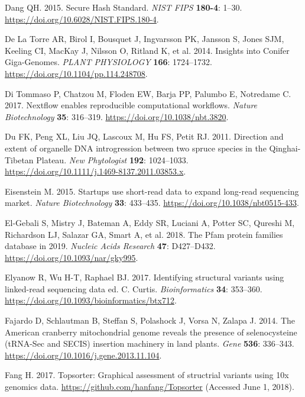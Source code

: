 \documentclass[
  12pt,
  oneside,
  openany]{book}
\begin{document}
\leavevmode\hypertarget{ref-Dang_2015}{}%
Dang QH. 2015. Secure Hash Standard. \emph{NIST FIPS} \textbf{180-4}: 1--30. \url{https://doi.org/10.6028/NIST.FIPS.180-4}.

\leavevmode\hypertarget{ref-De_La_Torre_2014}{}%
De La Torre AR, Birol I, Bousquet J, Ingvarsson PK, Jansson S, Jones SJM, Keeling CI, MacKay J, Nilsson O, Ritland K, et al. 2014. Insights into Conifer Giga-Genomes. \emph{PLANT PHYSIOLOGY} \textbf{166}: 1724--1732. \url{https://doi.org/10.1104/pp.114.248708}.

\leavevmode\hypertarget{ref-Di_Tommaso_2017}{}%
Di Tommaso P, Chatzou M, Floden EW, Barja PP, Palumbo E, Notredame C. 2017. Nextflow enables reproducible computational workflows. \emph{Nature Biotechnology} \textbf{35}: 316--319. \url{https://doi.org/10.1038/nbt.3820}.

\leavevmode\hypertarget{ref-Du_2011}{}%
Du FK, Peng XL, Liu JQ, Lascoux M, Hu FS, Petit RJ. 2011. Direction and extent of organelle DNA introgression between two spruce species in the Qinghai-Tibetan Plateau. \emph{New Phytologist} \textbf{192}: 1024--1033. \url{https://doi.org/10.1111/j.1469-8137.2011.03853.x}.

\leavevmode\hypertarget{ref-Eisenstein_2015}{}%
Eisenstein M. 2015. Startups use short-read data to expand long-read sequencing market. \emph{Nature Biotechnology} \textbf{33}: 433--435. \url{https://doi.org/10.1038/nbt0515-433}.

\leavevmode\hypertarget{ref-El_Gebali_2018}{}%
El-Gebali S, Mistry J, Bateman A, Eddy SR, Luciani A, Potter SC, Qureshi M, Richardson LJ, Salazar GA, Smart A, et al. 2018. The Pfam protein families database in 2019. \emph{Nucleic Acids Research} \textbf{47}: D427--D432. \url{https://doi.org/10.1093/nar/gky995}.

\leavevmode\hypertarget{ref-Elyanow_2017}{}%
Elyanow R, Wu H-T, Raphael BJ. 2017. Identifying structural variants using linked-read sequencing data ed. C. Curtis. \emph{Bioinformatics} \textbf{34}: 353--360. \url{https://doi.org/10.1093/bioinformatics/btx712}.

\leavevmode\hypertarget{ref-Fajardo_2014}{}%
Fajardo D, Schlautman B, Steffan S, Polashock J, Vorsa N, Zalapa J. 2014. The American cranberry mitochondrial genome reveals the presence of selenocysteine (tRNA-Sec and SECIS) insertion machinery in land plants. \emph{Gene} \textbf{536}: 336--343. \url{https://doi.org/10.1016/j.gene.2013.11.104}.

\leavevmode\hypertarget{ref-URL_Topsorter}{}%
Fang H. 2017. Topsorter: Graphical assessment of structrial variants using 10x genomics data. \url{https://github.com/hanfang/Topsorter} (Accessed June 1, 2018).
\end{document}
